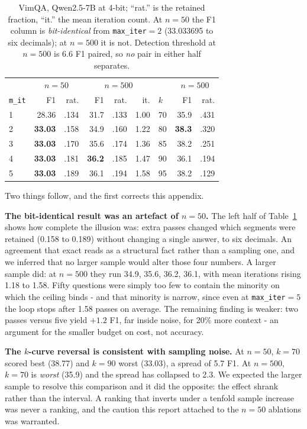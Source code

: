 \documentclass[11pt]{article}
\begin{document}
\begin{table}[htbp]
\centering
\footnotesize
\setlength{\tabcolsep}{2.6pt}
\begin{tabular}{lrr|rrr|lrr}
\toprule
& \multicolumn{2}{c|}{$n{=}50$} & \multicolumn{3}{c|}{$n{=}500$} & & \multicolumn{2}{c}{$n{=}500$} \\
\texttt{m\_it} & F1 & rat. & F1 & rat. & it. & $k$ & F1 & rat. \\
\midrule
1 & 28.36 & .134 & 31.7 & .133 & 1.00 & 70 & 35.9 & .431 \\
2 & \textbf{33.03} & .158 & 34.9 & .160 & 1.22 & 80 & \textbf{38.3} & .320 \\
3 & \textbf{33.03} & .170 & 35.6 & .174 & 1.36 & 85 & 38.2 & .251 \\
4 & \textbf{33.03} & .181 & \textbf{36.2} & .185 & 1.47 & 90 & 36.1 & .194 \\
5 & \textbf{33.03} & .189 & 36.1 & .194 & 1.58 & 95 & 38.2 & .129 \\
\bottomrule
\end{tabular}
\caption{VimQA, Qwen2.5-7B at 4-bit; ``rat.'' is the retained fraction, ``it.''
the mean iteration count. At $n=50$ the F1 column is
\emph{bit-identical} from \texttt{max\_iter}${}=2$ (33.033695 to six decimals);
at $n=500$ it is not. Detection threshold at $n=500$ is $6.6$ F1 paired, so
\emph{no} pair in either half separates.}
\label{tab:abl500}
\end{table}

Two things follow, and the first corrects this appendix.

\textbf{The bit-identical result was an artefact of $n=50$.} The left half of
Table~\ref{tab:abl500} shows how complete the illusion was: extra passes changed
which segments were retained (0.158 to 0.189) without changing a single answer,
to six decimals. An agreement that exact reads as a structural fact rather than a
sampling one, and we inferred that no larger sample would alter those four numbers.
A larger sample did: at $n=500$ they run 34.9, 35.6, 36.2, 36.1, with mean iterations
rising 1.18 to 1.58. Fifty questions were simply too few to contain the minority
on which the ceiling binds - and that minority is narrow, since even at
\texttt{max\_iter}${}=5$ the loop stops after 1.58 passes on average. The
remaining finding is weaker: two passes versus five yield $+1.2$ F1, far inside noise, for
20\% more context - an argument for the smaller budget on cost, not accuracy.

\textbf{The $k$-curve reversal is consistent with sampling noise.} At $n=50$,
$k=70$ scored best (38.77) and $k=90$ worst (33.03), a spread of 5.7 F1. At
$n=500$, $k=70$ is \emph{worst} (35.9) and the spread has collapsed to 2.3. We
expected the larger sample to resolve this comparison and it did the opposite:
the effect shrank rather than the interval. A ranking that inverts under a
tenfold sample increase was never a ranking, and the caution this report
attached to the $n=50$ ablations was warranted.
\end{document}

